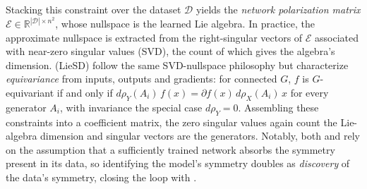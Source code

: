 \documentclass[mathematics,review,submit,moreauthors]{Definitions/mdpi}
\begin{document}
Stacking this constraint over the dataset $\mathcal{D}$ yields the \emph{network polarization matrix} $\mathcal{E} \in \mathbb{R}^{|\mathcal{D}| \times n^2}$, whose nullspace is the learned Lie algebra.
In practice, the approximate nullspace is extracted from the right-singular vectors of $\mathcal{E}$ associated with near-zero singular values (SVD), the count of which gives the algebra's dimension.
\citet{hu2025nn} (LieSD) follow the same SVD-nullspace philosophy but characterize \emph{equivariance} from inputs, outputs and gradients: for connected $G$, $f$ is $G$-equivariant if and only if $d\rho_Y(A_i)\,f(x) = \partial f(x)\,d\rho_X(A_i)\,x$ for every generator $A_i$, with invariance the special case $d\rho_Y = 0$.
Assembling these constraints into a coefficient matrix, the zero singular values again count the Lie-algebra dimension and singular vectors are the generators.\newline
Notably, both \citet{krippendorf2020} and \citet{hu2025nn} rely on the assumption that a sufficiently trained network absorbs the symmetry present in its data, so identifying the model's symmetry doubles as \emph{discovery} of the data's symmetry, closing the loop with .
\end{document}
